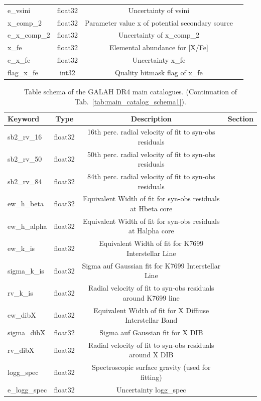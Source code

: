 \documentclass[
  journal=pasa,
  manuscript=research-paper, %
  year=2024,
  volume=37
]{cup-journal}
\begin{document}
\begin{table}
\begin{tabular}{lccc}
e\_vsini	&	float32	&	Uncertainty of vsini	&		\\
x\_comp\_2	&	float32	&	Parameter value x of potential secondary source	&		\\
e\_x\_comp\_2	&	float32	&	Uncertainty of x\_comp\_2	&		\\
x\_fe	&	float32	&	Elemental abundance for [X/Fe]	&		\\
e\_x\_fe	&	float32	&	Uncertainty x\_fe	&		\\
flag\_x\_fe	&	int32	&	Quality bitmask flag of x\_fe	&		\\
\hline
\end{tabular}
\end{table}

\begin{table}
\caption{Table schema of the GALAH DR4 main catalogues. (Continuation of Tab.~\ref{tab:main_catalog_schema1}).} \label{tab:main_catalog_schema2}
\centering
\begin{tabular}{lccc}
\hline
Keyword	&	Type	&	Description	&	Section	\\
\hline
sb2\_rv\_16	&	float32	&	16th perc. radial velocity of fit to syn-obs residuals	&		\\
sb2\_rv\_50	&	float32	&	50th perc. radial velocity of fit to syn-obs residuals	&		\\
sb2\_rv\_84	&	float32	&	84th perc. radial velocity of fit to syn-obs residuals	&		\\
ew\_h\_beta	&	float32	&	Equivalent Width of fit for syn-obs residuals at Hbeta core	&		\\
ew\_h\_alpha	&	float32	&	Equivalent Width of fit for syn-obs residuals at Halpha core	&		\\
ew\_k\_is	&	float32	&	Equivalent Width of fit for K7699 Interstellar Line	&		\\
sigma\_k\_is	&	float32	&	Sigma auf Gaussian fit for K7699 Interstellar Line	&		\\
rv\_k\_is	&	float32	&	Radial velocity of fit to syn-obs residuals around K7699 line	&		\\
ew\_dibX	&	float32	&	Equivalent Width of fit for X Diffiuse Interstellar Band	&		\\
sigma\_dibX	&	float32	&	Sigma auf Gaussian fit for X DIB	&		\\
rv\_dibX	&	float32	&	Radial velocity of fit to syn-obs residuals around X DIB	&		\\
logg\_spec	&	float32	&	Spectroscopic surface gravity (used for fitting)	&		\\
e\_logg\_spec	&	float32	&	Uncertainty logg\_spec	&		\\

\end{tabular}
\end{table}
\end{document}
